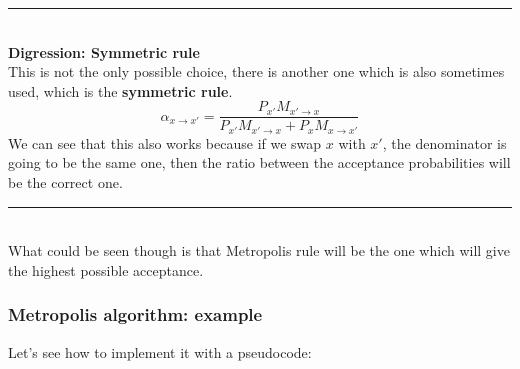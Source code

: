 \noindent\rule{8cm}{0.4pt}\\
\textbf{Digression: Symmetric rule}\\
This is not the only possible choice, there is another one which is also sometimes used, which is the \textbf{symmetric rule}.
\[
\alpha_{x\rightarrow x'} = \frac{P_{x'}M_{x'\rightarrow x}}{P_{x'}M_{x'\rightarrow x}+P_xM_{x\rightarrow x'}}
\]
We can see that this also works because if we swap $x$ with $x'$, the denominator is going to be the same one, then the ratio between the acceptance probabilities will be the correct one.\\
\noindent\rule{8cm}{0.4pt}\\
What could be seen though is that Metropolis rule will be the one which will give the highest possible acceptance.\\
\subsubsection{Metropolis algorithm: example}
Let's see how to implement it with a pseudocode:\\
